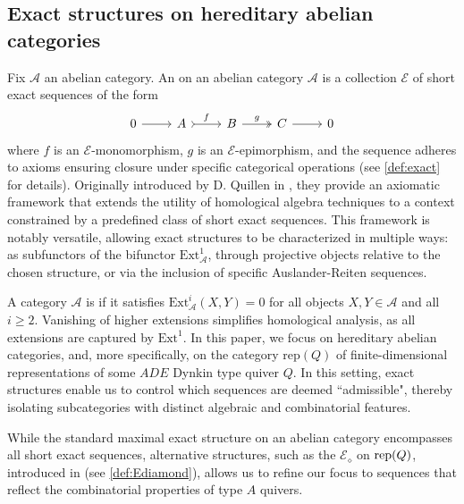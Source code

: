 \pagestyle{plain}

\subsection{Exact structures on hereditary abelian categories}
\label{ss:ExtStrHAbCat}

Fix $\mathscr{A}$ an abelian category. An  on an abelian category \(\mathscr{A}\) is a collection \(\mathcal{E}\) of short exact sequences of the form
\[\begin{tikzcd}
	0 & A & B  & C &  0
	\arrow[from=1-1, to=1-2]
	\arrow["f",tail, from=1-2, to=1-3]
	\arrow["g",two heads,from=1-3, to=1-4]
	\arrow[from=1-4, to=1-5]
\end{tikzcd}\]
where \(f\) is an \(\mathcal{E}\)-monomorphism, \(g\) is an \(\mathcal{E}\)-epimorphism, and the sequence adheres to axioms ensuring closure under specific categorical operations (see \cref{def:exact} for details). Originally introduced by D. Quillen in \cite{Q73}, they provide an axiomatic framework that extends the utility of homological algebra techniques to a context constrained by a predefined class of short exact sequences. This framework is notably versatile, allowing exact structures to be characterized in multiple ways: as subfunctors of the bifunctor \(\text{Ext}^1_{\mathscr{A}}\), through projective objects relative to the chosen structure, or via the inclusion of specific Auslander-Reiten sequences. 

A category \(\mathscr{A}\) is  if it satisfies \(\text{Ext}^i_{\mathscr{A}}(X, Y) = 0\) for all objects \(X, Y \in \mathscr{A}\) and all \(i \geq 2\). Vanishing of higher extensions simplifies homological analysis, as all extensions are captured by \(\text{Ext}^1\). In this paper, we focus on hereditary abelian categories, and, more specifically, on the category \(\text{rep}(Q)\) of finite-dimensional representations of some $ADE$ Dynkin type quiver \(Q\). In this setting, exact structures enable us to control which sequences are deemed ``admissible", thereby isolating subcategories with distinct algebraic and combinatorial features. 

While the standard maximal exact structure on an abelian category encompasses all short exact sequences, alternative structures, such as the  \(\mathcal{E}_\diamond\) on $\operatorname{rep}(Q)$, introduced in \cite{BHRS24} (see \cref{def:Ediamond}), allows us to refine our focus to sequences that reflect the combinatorial properties of type $A$ quivers.

